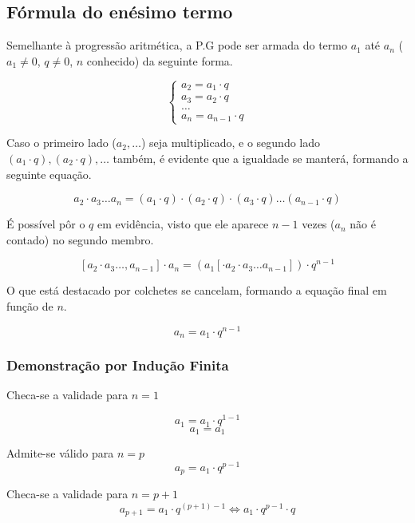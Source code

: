\subsection{Fórmula do enésimo termo}

Semelhante à progressão aritmética, a P.G pode ser armada do termo $a_{1}$ até $a_{n}$ ($a_{1} \neq 0$, $q \neq 0$, $n$ conhecido) da seguinte forma.

\begin{equation*}
\begin{cases}
a_{2} = a_{1}\cdot q \\
a_{3} = a_{2}\cdot q \\
\dots \\
a_{n} = a_{n - 1} \cdot q
\end{cases}
\end{equation*}

Caso o primeiro lado ($a_{2}, \dots$) seja multiplicado, e o segundo lado $(a_{1}\cdot q), (a_{2}\cdot q), \dots$ também, é evidente que a igualdade se manterá, formando a seguinte equação.

\[a_{2} \cdot a_{3}\dots a_{n} = (a_1\cdot q) \cdot (a_2\cdot q) \cdot (a_3\cdot q) \dots (a_{n - 1} \cdot q)\]

É possível pôr o $q$ em evidência, visto que ele aparece $n - 1$ vezes ($a_{n}$ não é contado) no segundo membro.

\[[a_{2} \cdot a_{3}\dots, a_{n - 1}]\cdot a_{n} = (a_1 [\cdot a_2 \cdot a_3 \dots a_{n - 1}])\cdot q^{n - 1}\]

O que está destacado por colchetes se cancelam, formando a equação final em função de $n$.


\begin{tcolorbox}[colback=LightYellow]
\[a_{n} = a_1\cdot q^{n - 1}\]
\end{tcolorbox}

\subsubsection{Demonstração por Indução Finita}

\begin{itemize}
\begin{tcolorbox}[colback=LightYellow]
\item Checa-se a validade para $n = 1$

\[a_{1} = a_{1}\cdot q^{1-1}\]
\[a_{1} = a_{1}\]
\end{tcolorbox}

\begin{tcolorbox}[colback=LightYellow]
\item Admite-se válido para $n = p$
      \[a_{p} = a_{1}\cdot q^{p - 1}\]
\end{tcolorbox}

\begin{tcolorbox}[colback=LightYellow]
\item Checa-se a validade para $n = p + 1$
      \[a_{p + 1} = a_{1}\cdot q^{(p + 1) - 1} \Leftrightarrow a_{1}\cdot q^{p-1}\cdot q\]
\end{tcolorbox}
\end{itemize}

